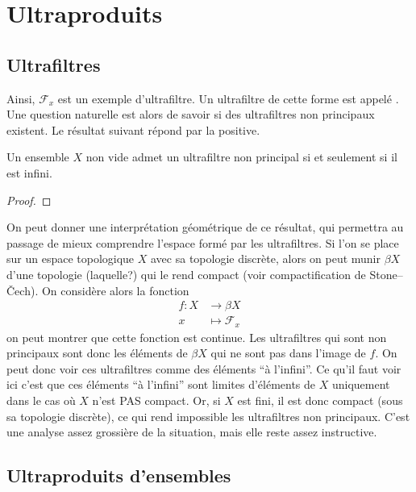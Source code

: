 \chapter{Ultraproduits}
\label{chp.ultraproduits}



\minitoc


\section{Ultrafiltres}

Ainsi, $\mathcal{F}_{x}$ est un exemple d'ultrafiltre. Un ultrafiltre de cette forme est appelé . Une question naturelle est alors de savoir si des ultrafiltres non principaux existent. Le résultat suivant répond par la positive.

\begin{proposition}
	Un ensemble $X$ non vide admet un ultrafiltre non principal si et seulement si il est infini.
\end{proposition}

\begin{proof}
\end{proof}

On peut donner une interprétation géométrique de ce résultat, qui permettra au passage de mieux comprendre l'espace formé par les ultrafiltres. Si l'on se place sur un espace topologique $X$ avec sa topologie discrète, alors on peut munir $\beta X$ d'une topologie (laquelle?) qui le rend compact (voir compactification de Stone--Čech). On considère alors la fonction
\begin{align*}
	f\colon X&\longrightarrow\beta X \\
	x&\longmapsto\mathcal{F}_{x}
\end{align*}
on peut montrer que cette fonction est continue. Les ultrafiltres qui sont non principaux sont donc les éléments de $\beta X$ qui ne sont pas dans l'image de $f$. On peut donc voir ces ultrafiltres comme des éléments ``à l'infini''. Ce qu'il faut voir ici c'est que ces éléments ``à l'infini'' sont limites d'éléments de $X$ uniquement dans le cas où $X$ n'est PAS compact. Or, si $X$ est fini, il est donc compact (sous sa topologie discrète), ce qui rend impossible les ultrafiltres non principaux. C'est une analyse assez grossière de la situation, mais elle reste assez instructive.



\section{Ultraproduits d'ensembles}

